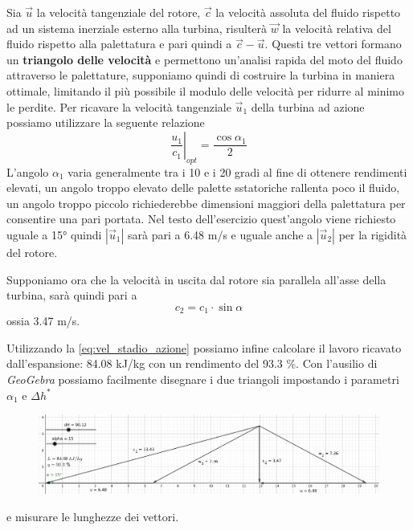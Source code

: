 \documentclass[a4paper,12pt]{article}
\begin{document}
Sia $\vec u$ la velocità tangenziale del rotore, $\vec c$ la velocità assoluta del fluido rispetto ad un sistema inerziale esterno alla turbina,
risulterà $\vec w$ la velocità relativa del fluido rispetto alla palettatura e pari quindi a  $\vec c - \vec u$.
Questi tre vettori formano un \textbf{triangolo delle velocità} e permettono un'analisi rapida del moto del fluido attraverso le palettature,
supponiamo quindi di costruire la turbina in maniera ottimale, limitando il più possibile il modulo delle velocità per ridurre al minimo le perdite.
Per ricavare la velocità tangenziale $\vec u_1$ della turbina ad azione possiamo utilizzare la seguente relazione
\begin{equation}
    \left.\frac{u_1}{c_1}\right|_{opt} = \frac{\cos \alpha_1}{2}
\end{equation}
L'angolo $\alpha_1$ varia generalmente tra i 10 e i 20 gradi al fine di ottenere rendimenti elevati, un angolo troppo elevato delle palette sstatoriche rallenta poco 
il fluido, un angolo troppo piccolo richiederebbe dimensioni maggiori della palettatura per consentire una pari portata.
Nel testo dell'esercizio quest'angolo viene richiesto uguale a 15° quindi $|\vec u_1|$ sarà pari a 6.48 m/s e uguale anche a $|\vec u_2|$ per la rigidità
del rotore.

Supponiamo ora che la velocità in uscita dal rotore sia parallela all'asse della turbina, sarà quindi pari a
\begin{equation}
    c_2 = c_1 \cdot \sin \alpha
\end{equation}
ossia 3.47 m/s.

Utilizzando la \eqref{eq:vel_stadio_azione} possiamo infine calcolare il lavoro ricavato dall'espansione: 84.08 kJ/kg con un rendimento del 93.3 \%.
Con l'ausilio di \textit{GeoGebra} possiamo facilmente disegnare i due triangoli impostando i parametri $\alpha_1$ e $\Delta h^*$
\begin{figure}[H]
    \label{fig:triangoli_azione}
    \centering
    \includegraphics[width=\linewidth]{media/triangoli_azione.png}
\end{figure}
e misurare le lunghezze dei vettori.
\end{document}
